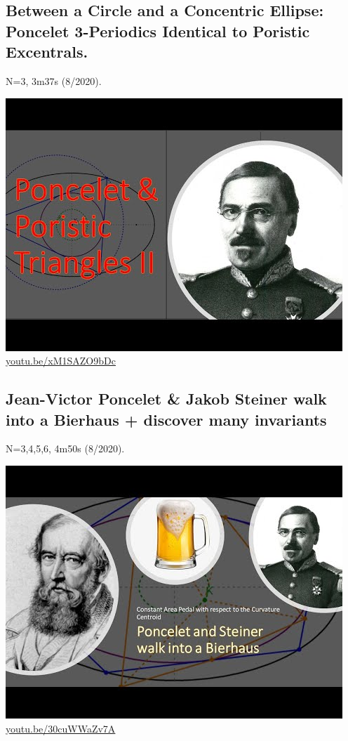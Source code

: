 \documentclass[12pt]{amsart}
\begin{document}
\subsection{Between a Circle and a Concentric Ellipse: Poncelet 3-Periodics Identical to Poristic Excentrals.}
\label{vid:xM1SAZO9bDc}
\noindent N=3, 3m37s (8/2020). 
\begin{center}\includegraphics[width=.5\textwidth]{pics/xM1SAZO9bDc.jpg} \\ 
\href{https://youtu.be/xM1SAZO9bDc}{\url{youtu.be/xM1SAZO9bDc}}\end{center}
% 
\subsection{Jean-Victor Poncelet \& Jakob Steiner walk into a Bierhaus + discover many invariants}
\label{vid:30cuWWaZv7A}
\noindent N=3,4,5,6, 4m50s (8/2020). 
\begin{center}\includegraphics[width=.5\textwidth]{pics/30cuWWaZv7A.jpg} \\ 
\href{https://youtu.be/30cuWWaZv7A}{\url{youtu.be/30cuWWaZv7A}}\end{center}
% 
\end{document}
